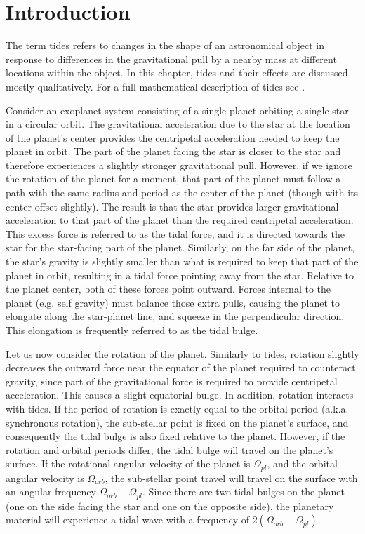 \section{Introduction}
%
\label{sec:introduction}

The term tides refers to changes in the shape of an astronomical object in
response to differences in the gravitational pull by a nearby mass at different
locations within the object. In this chapter, tides and their effects are
discussed mostly qualitatively. For a full mathematical description of tides see
\cite{Murray_Dermott_book}.

Consider an exoplanet system consisting of a single planet orbiting a single
star in a circular orbit. The gravitational acceleration due to the star at the
location of the planet's center provides the centripetal acceleration needed to
keep the planet in orbit. The part of the planet facing the star is closer to
the star and therefore experiences a slightly stronger gravitational pull.
However, if we ignore the rotation of the planet for a moment, that part of the
planet must follow a path with the same radius and period as the center of the
planet (though with its center offset slightly). The result is that the star
provides larger gravitational acceleration to that part of the planet than the
required centripetal acceleration. This excess force is referred to as the tidal
force, and it is directed towards the star for the star-facing part of the
planet. Similarly, on the far side of the planet, the star's gravity is slightly
smaller than what is required to keep that part of the planet in orbit,
resulting in a tidal force pointing away from the star. Relative to the planet
center, both of these forces point outward. Forces internal to the planet (e.g.
self gravity) must balance those extra pulls, causing the planet to elongate
along the star-planet line, and squeeze in the perpendicular direction. This
elongation is frequently referred to as the tidal bulge.

Let us now consider the rotation of the planet. Similarly to tides, rotation
slightly decreases the outward force near the equator of the planet required to
counteract gravity, since part of the gravitational force is required to provide
centripetal acceleration. This causes a slight equatorial bulge. In addition,
rotation interacts with tides. If the period of rotation is exactly equal to the
orbital period (a.k.a. synchronous rotation), the sub-stellar point is fixed on
the planet's surface, and consequently the tidal bulge is also fixed relative to
the planet. However, if the rotation and orbital periods differ, the tidal bulge
will travel on the planet's surface. If the rotational angular velocity of the
planet is $\Omega_{pl}$, and the orbital angular velocity is $\Omega_{orb}$,
the sub-stellar point travel will travel on the surface with an angular
frequency $\Omega_{orb} - \Omega_{pl}$. Since there are two tidal bulges on the
planet (one on the side facing the star and one on the opposite side), the
planetary material will experience a tidal wave with a frequency of
$2(\Omega_{orb} - \Omega_{pl})$.

